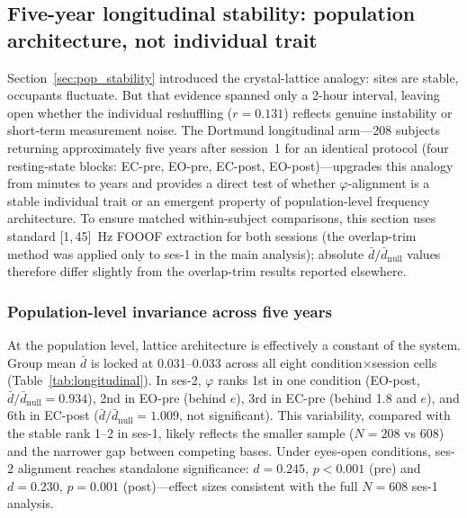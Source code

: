 \documentclass[11pt,a4paper]{article}
\newcommand{\phisym}{\varphi}
\begin{document}
\subsection{Five-year longitudinal stability: population architecture, not individual trait}
\label{sec:longitudinal}

Section~\ref{sec:pop_stability} introduced the crystal-lattice analogy: sites are stable, occupants fluctuate. But that evidence spanned only a 2-hour interval, leaving open whether the individual reshuffling ($r = 0.131$) reflects genuine instability or short-term measurement noise. The Dortmund longitudinal arm---208 subjects returning approximately five years after session~1 for an identical protocol (four resting-state blocks: EC-pre, EO-pre, EC-post, EO-post)---upgrades this analogy from minutes to years and provides a direct test of whether $\phisym$-alignment is a stable individual trait or an emergent property of population-level frequency architecture. To ensure matched within-subject comparisons, this section uses standard [1,\,45]~Hz FOOOF extraction for both sessions (the overlap-trim method was applied only to ses-1 in the main analysis); absolute $\bar{d}/\bar{d}_{\text{null}}$ values therefore differ slightly from the overlap-trim results reported elsewhere.

\subsubsection{Population-level invariance across five years}

At the population level, lattice architecture is effectively a constant of the system. Group mean $\bar{d}$ is locked at 0.031--0.033 across all eight condition$\times$session cells (Table~\ref{tab:longitudinal}). In ses-2, $\phisym$ ranks 1st in one condition (EO-post, $\bar{d}/\bar{d}_{\text{null}} = 0.934$), 2nd in EO-pre (behind $e$), 3rd in EC-pre (behind 1.8 and $e$), and 6th in EC-post ($\bar{d}/\bar{d}_{\text{null}} = 1.009$, not significant). This variability, compared with the stable rank 1--2 in ses-1, likely reflects the smaller sample ($N = 208$ vs 608) and the narrower gap between competing bases. Under eyes-open conditions, ses-2 alignment reaches standalone significance: $d = 0.245$, $p < 0.001$ (pre) and $d = 0.230$, $p = 0.001$ (post)---effect sizes consistent with the full $N = 608$ ses-1 analysis.
\end{document}
